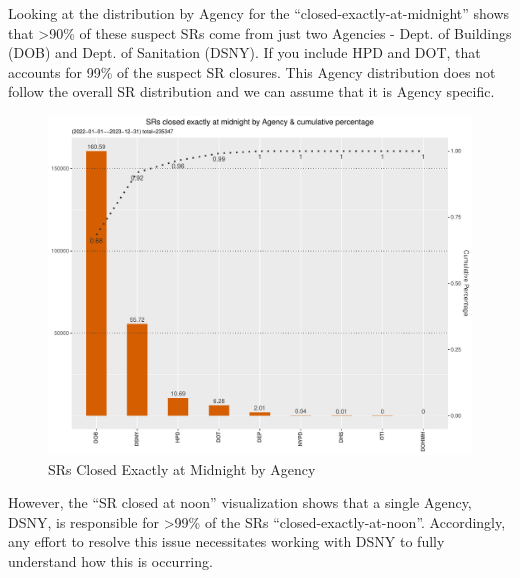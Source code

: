 \documentclass[12pt, titlepage]{article}
\begin{document}
{	Looking at the distribution by Agency for the ``closed-exactly-at-midnight'' 
	shows that \textgreater90\% of these suspect SRs come from just two 
	Agencies - Dept. of Buildings (DOB) and Dept. of Sanitation (DSNY). 
	If you include HPD and DOT, that accounts for 99\% of the suspect 
	SR closures. This Agency distribution does not follow the overall 
	SR distribution and we can assume that it is Agency specific. 

	\begin{figure}[tbp]
		\centering
		\includegraphics[width = \textwidth]{closed_at_midnight_chart.pdf}
		\caption{SRs Closed Exactly at Midnight by Agency}
		\label{fig:midnight-closed}
	\end{figure}	

	However, the ``SR closed at noon'' visualization shows that  a single 
	Agency, DSNY, is responsible for \textgreater99\% of the 
	SRs ``closed-exactly-at-noon''. Accordingly, any effort to 
	resolve this issue necessitates working with DSNY to fully understand 
	how this is occurring. 
	
}
\end{document}
